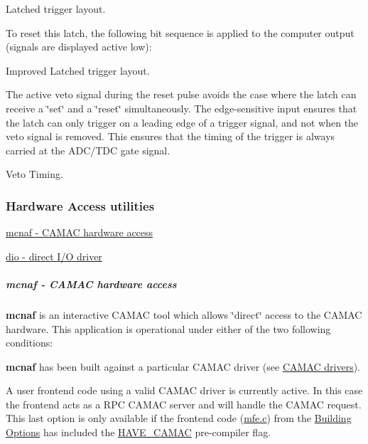\begin{center} Latched trigger layout.  \end{center} 

To reset this latch, the following bit sequence is applied to the computer output (signals are displayed active low):

\begin{center} Improved Latched trigger layout.  \end{center} 

The active veto signal during the reset pulse avoids the case where the latch can receive a \char`\"{}set\char`\"{} and a \char`\"{}reset\char`\"{} simultaneously. The edge-\/sensitive input ensures that the latch can only trigger on a leading edge of a trigger signal, and not when the veto signal is removed. This ensures that the timing of the trigger is always carried at the ADC/TDC gate signal.

\begin{center} Veto Timing.  \end{center} 

\par
 

\par
 \label{index_end}
\hypertarget{index_end}{}
 \subsubsection{Hardware Access utilities}\label{FE_utils}
\par
 

\par



\begin{DoxyItemize}
\item \hyperlink{FE_utils_FE_mcnaf_utility}{mcnaf -\/ CAMAC hardware access}
\item \hyperlink{FE_utils_FE_dio_utility}{dio -\/ direct I/O driver}
\end{DoxyItemize}\hypertarget{FE_utils_FE_mcnaf_utility}{}\subparagraph{mcnaf        -\/ CAMAC hardware access}\label{FE_utils_FE_mcnaf_utility}
{\bfseries mcnaf} is an interactive CAMAC tool which allows \char`\"{}direct\char`\"{} access to the CAMAC hardware. This application is operational under either of the two following conditions:
\begin{DoxyEnumerate}
\item {\bfseries mcnaf} has been built against a particular CAMAC driver (see \hyperlink{FE_Hardware_CAMAC_drivers}{CAMAC drivers}).
\item A user frontend code using a valid CAMAC driver is currently active. In this case the frontend acts as a RPC CAMAC server and will handle the CAMAC request. This last option is only available if the frontend code (\hyperlink{mfe_8c}{mfe.c}) from the \hyperlink{BuildingOptions_BO_building_option}{Building Options} has included the \hyperlink{BuildingOptions_BO_HAVE_CAMAC}{HAVE\_\-CAMAC} pre-\/compiler flag.
\end{DoxyEnumerate}


